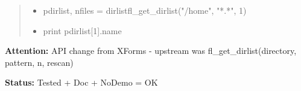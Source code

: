 \begin{boxedminipage}{\funcwidth}
\begin{quote}
\begin{itemize}
  \item
    \setlength{\parskip}{0.6ex}
pdirlist, nfiles = dirlistfl\_get\_dirlist("/home", "*.*", 1)



  \item print pdirlist[1].name



\end{itemize}

\end{quote}

\textbf{Attention:} API change from XForms - upstream was fl\_get\_dirlist(directory, pattern, 
n, rescan)



\textbf{Status:} Tested + Doc + NoDemo = OK



    \end{boxedminipage}

    \label{xformslib:flfilesys:fl_set_dirlist_filter}

    \vspace{0.5ex}


